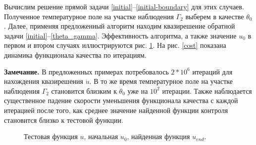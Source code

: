 \documentclass[10pt]{article}
\begin{document}
    Вычислим решение прямой задачи \eqref{initial}--\eqref{initial-boundary} для этих случаев. Полученное температурное поле на участке наблюдения $\Gamma_2$ выберем в качестве $\theta_0$. Далее, применяя предложенный алгоритм находим квазирешение обратной задачи \eqref{initial}--\eqref{theta_gamma}. Эффективность алгоритма, а также значение $u_0$ в первом и втором случаях иллюстрируются рис. \ref{control}. На рис. \ref{cost} показана динамика функционала качества по итерациям.

    {\bf Замечание.} В предложенных примерах потребовалось $2*10^6$ итераций для нахождения квазирешения $u$. В то же время температурное поле на участке наблюдения $\Gamma_2$ становится близким к $\theta_0$ уже на $10^2$ итерации. Также наблюдается существенное падение скорости уменьшения функционала качества с каждой итерацией после того, как среднее значение найденной функции контроля становится близко к тестовой функции.
    \begin{figure}[H]
        \centering
        \caption{Тестовая функция $u$, начальная $u_0$, найденная функция $u_{end}.$}
        \label{control}
    \end{figure}
\end{document}

